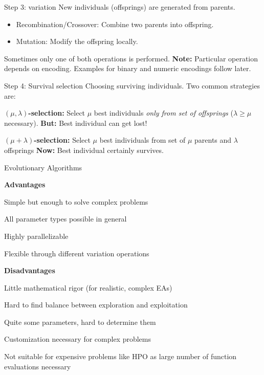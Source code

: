 \documentclass[11pt,compress,t,notes=noshow, xcolor=table]{beamer}
\begin{document}
\begin{framev}{Step 3: variation}
New individuals (offsprings) are generated from parents.
\begin{itemize}
\item Recombination/Crossover: Combine two parents into offspring.
\item Mutation: Modify the offspring locally.
\end{itemize}
Sometimes only one of both operations is performed.
\spacer
{}
\textbf{Note: } Particular operation depends on encoding.
Examples for binary and numeric encodings follow later.
\end{framev}


\begin{framev}{Step 4: Survival selection}
Choosing surviving individuals.
Two common strategies are:
\spacer
\begin{itemizeL}
\item \textbf{$(\mu, \lambda)$-selection:}
Select $\mu$ best individuals \textit{only from set of offsprings} ($\lambda \ge \mu$ necessary).
\textbf{But:} Best individual can get lost!
\item \textbf{$(\mu + \lambda)$-selection:}
Select $\mu$ best individuals from set of $\mu$ parents and $\lambda$ offsprings
\textbf{Now:} Best individual certainly survives.
\end{itemizeL}
\end{framev}


\begin{framei}{Evolutionary Algorithms}
\item \textbf{Advantages}
\item Simple but enough to solve complex problems
\item All parameter types possible in general
\item Highly parallelizable
\item Flexible through different variation operations
\spacer
\item \textbf{Disadvantages}
\item Little mathematical rigor (for realistic, complex EAs)
\item Hard to find balance between exploration and exploitation
\item Quite some parameters, hard to determine them
\item Customization necessary for complex problems
\item Not suitable for expensive problems like HPO as large number of function evaluations necessary
\end{framei}

\endlecture
\end{document}
